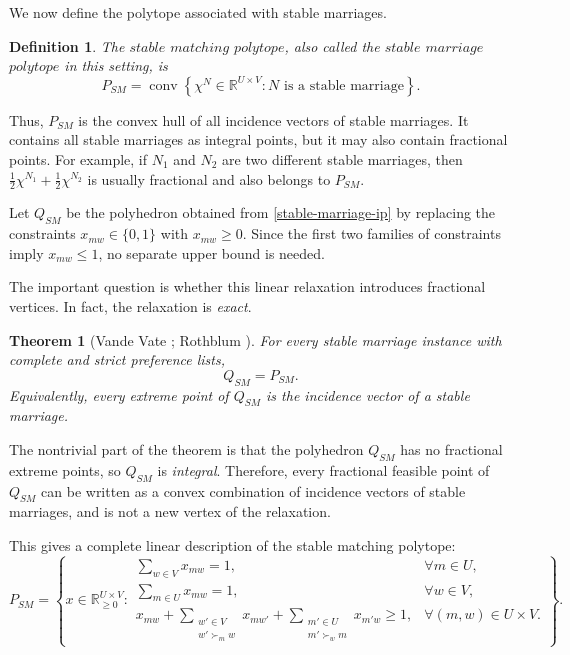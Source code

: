 \documentclass[12pt]{report}
\newtheorem{ttheorem}[base]{Theorem}
\newtheorem{ddef}[base]{Definition}
\numberwithin{algorithm}{chapter}
\begin{document}
	
	We now define the polytope associated with stable marriages.
	
	\begin{ddef}
		The $\mathit{stable}$ $\mathit{matching}$ $\mathit{polytope}$, also called the $\mathit{stable}$ $\mathit{marriage}$ $\mathit{polytope}$ in this setting, is
		\[
		P_{SM}
		=
		\operatorname{conv}
		\left\{
		\chi^N\in \mathbb{R}^{U\times V}
		:
		N \text{ is a stable marriage}
		\right\}.
		\]
	\end{ddef}
	
	Thus, $P_{SM}$ is the convex hull of all incidence vectors of stable marriages. It contains all stable marriages as integral points, but it may also contain fractional points. For example, if $N_1$ and $N_2$ are two different stable marriages, then $\frac{1}{2}\chi^{N_1}+\frac{1}{2}\chi^{N_2}$
	is usually fractional and also belongs to $P_{SM}$.
	
	Let $Q_{SM}$ be the polyhedron obtained from \eqref{stable-marriage-ip} by replacing the constraints $x_{mw}\in\{0,1\}$
	with $x_{mw}\geq 0.$
	Since the first two families of constraints imply $x_{mw}\leq 1$, no separate upper bound is needed.
	
	The important question is whether this linear relaxation introduces fractional vertices. In fact, the relaxation is \emph{exact}.
	
	\begin{ttheorem}[Vande Vate \cite{VandeVate1989}; Rothblum \cite{Rothblum1992}]
		For every stable marriage instance with complete and strict preference lists,
		\[
		Q_{SM}=P_{SM}.
		\]
		Equivalently, every extreme point of $Q_{SM}$ is the incidence vector of a stable marriage.
	\end{ttheorem}
	
	The nontrivial part of the theorem is that the polyhedron $Q_{SM}$ has no fractional extreme points, so $Q_{SM}$ is \emph{integral}. Therefore, every fractional feasible point of $Q_{SM}$ can be written as a convex combination of incidence vectors of stable marriages, and is not a new vertex of the relaxation.
	
	This gives a complete linear description of the stable matching polytope:
	\[
	P_{SM}
	=
	\left\{
	x\in\mathbb{R}_{\geq 0}^{U\times V}
	:
	\begin{array}{ll}
		\sum_{w\in V}x_{mw}=1, & \forall m\in U,\\[2mm]
		\sum_{m\in U}x_{mw}=1, & \forall w\in V,\\[2mm]
		x_{mw}
		+
		\sum_{\substack{w'\in V\\ w'\succ_m w}}x_{mw'}
		+
		\sum_{\substack{m'\in U\\ m'\succ_w m}}x_{m'w}
		\geq 1,
		& \forall (m,w)\in U\times V.
	\end{array}
	\right\}.
	\]
	
\end{document}
